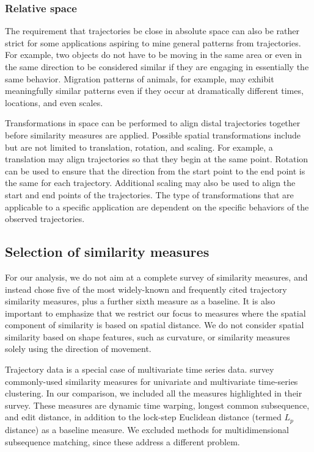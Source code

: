 \documentclass{interact}
\begin{document}
\subsubsection{Relative space}
The requirement that trajectories be close in absolute space can also be rather strict for some applications aspiring to mine general patterns from trajectories. For example, two objects do not have to be moving in the same area or even in the same direction to be considered similar if they are engaging in essentially the same behavior. Migration patterns of animals, for example, may exhibit meaningfully similar patterns even if they occur at dramatically different times, locations, and even scales.

Transformations in space can be performed to align distal trajectories together before similarity measures are applied. Possible spatial transformations include but are not limited to translation, rotation, and scaling. For example, a translation may align trajectories so that they begin at the same point. Rotation can be used to ensure that the direction from the start point to the end point is the same for each trajectory. Additional scaling may also be used to align the start and end points of the trajectories. The type of transformations that are applicable to a specific application are dependent on the specific behaviors of the observed trajectories.

\subsection{Selection of similarity measures}

For our analysis, we do not aim at a complete survey of similarity measures, and instead chose five of the most widely-known and frequently cited trajectory similarity measures, plus a further sixth measure as a baseline. It is also important to emphasize that we restrict our focus to measures where the spatial component of similarity is based on spatial distance. We do not consider spatial similarity based on shape features, such as curvature, or similarity measures solely using the direction of movement.

Trajectory data is a special case of multivariate time series data. \cite{kotsakos2013time} survey commonly-used similarity measures for univariate and multivariate time-series clustering. In our comparison, we included all the measures highlighted in their survey. These measures are dynamic time warping, longest common subsequence, and edit distance, in addition to the lock-step Euclidean distance (termed $L_p$ distance) as a baseline measure. We excluded methods for multidimensional subsequence matching, since these address a different problem.
\end{document}
